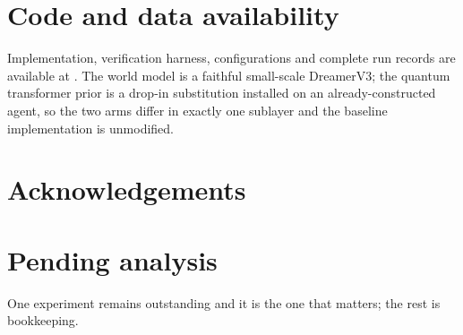 \documentclass[11pt,onecolumn]{article}
\newif\ifdraft
\newcommand{\pend}[1]{%
  \ifdraft\textcolor{PendFG}{\textbf{[}\textit{#1}\textbf{]}}\fi}
\begin{document}
\section*{Code and data availability}
Implementation, verification harness, configurations and complete run
records are available at \pend{repository URL and archival DOI}. The
world model is a faithful small-scale DreamerV3; the quantum transformer
prior is a drop-in substitution installed on an already-constructed
agent, so the two arms differ in exactly one sublayer and the baseline
implementation is unmodified.

\section*{Acknowledgements}
\pend{acknowledgements, funding, hardware access}

\appendix
\section{Pending analysis}\label{app:remaining}
One experiment remains outstanding and it is the one that matters; the
rest is bookkeeping.
\end{document}
